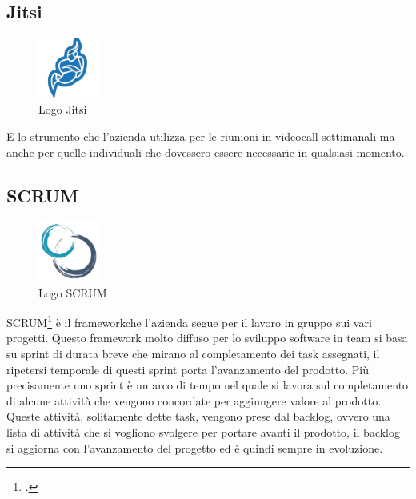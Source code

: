\subsection*{Jitsi}
\begin{figure}[H]
  \centering
  \includegraphics[width=2cm]{immagini/logo-Jitsi.jpg}
  \caption{Logo Jitsi}
\end{figure}
E lo strumento che l'azienda utilizza per le riunioni in videocall settimanali ma anche per quelle individuali che dovessero essere necessarie
in qualsiasi momento.

\subsection*{SCRUM}
\begin{figure}[H]
  \centering
  \includegraphics[width=2cm]{immagini/logo-SCRUM.jpg}
  \caption{Logo SCRUM}
\end{figure}
SCRUM\footcite{site:scrum} è il \gls{framework}\glsfirstoccur che l'azienda segue per il lavoro in gruppo sui vari progetti. Questo framework molto diffuso per lo sviluppo software in
team si basa su sprint di durata breve che mirano al completamento dei task assegnati, il ripetersi temporale di questi sprint porta l'avanzamento
del prodotto. Più precisamente uno sprint è un arco di tempo nel quale si lavora sul completamento di alcune attività che vengono concordate per aggiungere valore al prodotto.
Queste attività, solitamente dette task, vengono prese dal backlog, ovvero una lista di attività che si vogliono svolgere per portare avanti il prodotto, il backlog si aggiorna con
l'avanzamento del progetto ed è quindi sempre in evoluzione.

